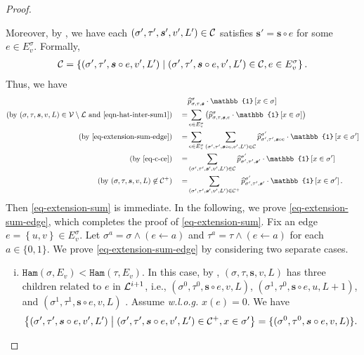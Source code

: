 \documentclass[11pt]{article}
\newcommand{\set}[1]{\left\{#1\right\}}
\renewcommand{\mid}{\;\middle\vert\;} \newcommand{\cmid}{\,:\,}
\newcommand{\id}[1]{\mathbb{1}\left[#1\right]}
\def\!#1{\mathtt{#1}}
\newcommand{\seqS}{\boldsymbol{s}}
\begin{document}
\begin{proof}
\begin{itemize}
    Moreover, by , we have each $(\sigma',\tau', \seqS',v',L')\in \+C$ satisfies $\seqS' = \seqS \circ e$ for some $e \in E_v^{\sigma}$. Formally,
    \begin{align}\label{eq-c-ce}
    \+C = \left\{(\sigma',\tau', \seqS\circ e,v',L')\mid (\sigma',\tau', \seqS\circ e,v',L')\in \+C,e\in E_v^{\sigma}\right\}.
    \end{align}
    Thus, we have 
    \begin{align*}
       &\widehat{p}^{\sigma}_{\sigma, \tau, \seqS} \cdot \id{x \in \sigma} \\
       (\text{by $(\sigma,\tau,\seqS,v,L)\in \+V\setminus \+L$ and \eqref{eqn-hat-inter-sum1}})\quad = &\sum_{e \in  E_v^{\sigma}} \left(\widehat{p}^{\sigma}_{\sigma, \tau, \seqS, e}\cdot \id{x \in \sigma}\right)\\ 
       (\text{by \eqref{eq-extension-sum-edge}})\quad = &\sum_{e \in  E_v^{\sigma}}\sum_{(\sigma',\tau', \seqS\circ e,v',L')\in \+C} \widehat{p}^{\sigma'}_{\sigma',\tau',\seqS\circ e}\cdot\id{ x\in \sigma'}\\
       (\text{by \eqref{eq-c-ce}})\quad  =&\sum_{(\sigma',\tau', \seqS',v',L')\in \+C} \widehat{p}^{\sigma'}_{\sigma',\tau',\seqS'}\cdot\id{ x\in \sigma'}\\
(\text{by $(\sigma,\tau,\seqS,v,L) \not\in \+C^{+}$})\quad =&\sum_{(\sigma',\tau', \seqS',v',L')\in \+C^{+}} \widehat{p}^{\sigma'}_{\sigma',\tau',\seqS'}\cdot\id{ x\in \sigma'}.
    \end{align*}
    Then \eqref{eq-extension-sum} is immediate.
    In the following, we prove \eqref{eq-extension-sum-edge}, which completes the proof of \eqref{eq-extension-sum}.
    Fix an edge $ e = \set{u,v} \in E_v^{\sigma}$.
    Let $\sigma^{a} = \sigma \land (e \gets a)$ and $\tau^{a} = \tau \land (e \gets a)$ for each $a\in \{0,1\}$.    
    We prove \eqref{eq-extension-sum-edge} by considering two separate cases. 
        \begin{enumerate}[(i)]
            \item ${\!{Ham}\left(\sigma,{E_v}\right)}<{\!{Ham}\left(\tau,{E_v}\right)}$. In this case, by , $(\sigma,\tau,\seqS,v,L)$ has three children related to $e$ in $\mathcal{L}^{i+1}$, i.e., $(\sigma^0, \tau^0, \seqS \circ e, v, L)$, $(\sigma^1, \tau^0, \seqS \circ e, u, L+1)$, and $(\sigma^1, \tau^1, \seqS \circ e, v, L)$ . Assume \emph{w.l.o.g.} $x(e) = 0$.
            We have 
            \[\left\{(\sigma',\tau', \seqS\circ e,v',L')\mid (\sigma',\tau', \seqS\circ e,v',L')\in \+C^{+},x\in \sigma'\right\} = \{ (\sigma^0, \tau^0, \seqS \circ e, v, L)\}.\]          

\end{enumerate}
\end{itemize}
\end{proof}
\end{document}
